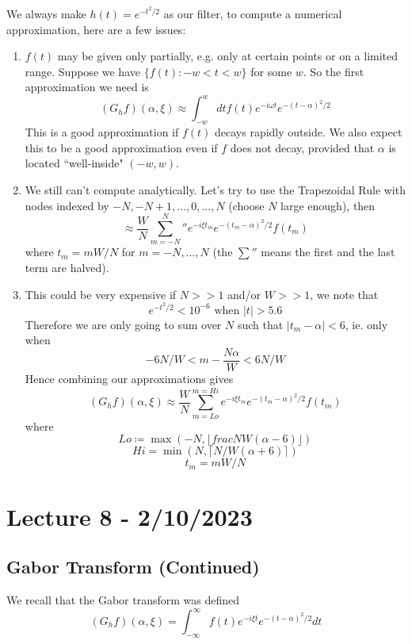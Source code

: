 \documentclass{article}
\begin{document}
We always make $h(t) = e^{-t^2/2}$ as our filter, to compute a numerical approximation, here are a few issues:
\begin{enumerate}
    \item $f(t)$ may be given only partially, e.g. only at certain points or on a limited range. Suppose we have $\{f(t): -w < t < w\}$ for some $w$. So the first approximation we need is
    \[(G_h f)(\alpha, \xi) \approx \int_{-w}^w dt f(t) e^{-i\omega t} e^{-(t- \alpha)^2/2}\]
    This is a good approximation if $f(t)$ decays rapidly outside. We also expect this to be a good approximation even if $f$ does not decay, provided that $\alpha$ is located ``well-inside" $(-w, w)$.
    \item We still can't compute analytically. Let's try to use the Trapezoidal Rule with nodes indexed by $-N, -N+1,..., 0, ..., N$ (choose $N$ large enough), then
    \[\approx \frac{W}{N} \sum_{m = -N}^N '' e^{-i \xi t_m} e^{-(t_m - \alpha)^2/2} f(t_m)\]
    where $t_m = m W/N$ for $m = -N, ..., N$ (the $\sum''$ means the first and the last term are halved).
    \item This could be very expensive if $N >> 1$ and/or $W >> 1$, we note that
    \[e^{-t^2/2} < 10^{-6} \text{ when } |t| > 5.6\]
    Therefore we are only going to sum over $N$ such that $|t_m - \alpha| < 6$, ie. only when
    \[-6N/W < m - \frac{N\alpha}{W} < 6N/W\]
    Hence combining our approximations gives
    \[(G_h f)(\alpha, \xi) \approx \frac{W}{N} \sum_{m = Lo}^{m = Hi}  e^{-i \xi t_m} e^{-(t_m - \alpha)^2/2} f(t_m)\]
    where
    \[Lo \coloneqq \max(-N, \lfloor frac{N}{W}(\alpha - 6) \rfloor)\]
    \[Hi = \min(N, \lceil N/W(\alpha + 6) \rceil)\]
    \[t_m = mW/N\]
\end{enumerate}

\newpage
\section{Lecture 8 - 2/10/2023}

\subsection{Gabor Transform (Continued)}
We recall that the Gabor transform was defined
\[(G_h f)(\alpha, \xi) = \int_{-\infty}^\infty f(t) e^{-i\xi t} e^{-(t- \alpha)^2/2} dt\]
\end{document}
